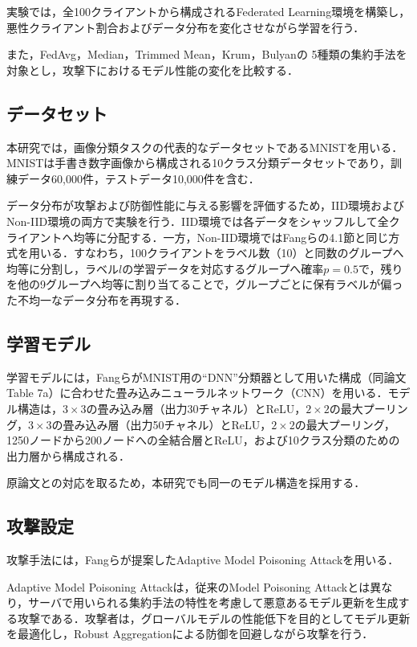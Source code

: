 \documentclass[a4j, twocolumn, dvipdfmx]{jsarticle}  %
\begin{document}
実験では，全100クライアントから構成されるFederated Learning環境を構築し，悪性クライアント割合およびデータ分布を変化させながら学習を行う．

また，FedAvg，Median，Trimmed Mean，Krum，Bulyanの
5種類の集約手法を対象とし，攻撃下におけるモデル性能の変化を比較する．

\subsection{データセット}

本研究では，画像分類タスクの代表的なデータセットであるMNISTを用いる．MNISTは手書き数字画像から構成される10クラス分類データセットであり，訓練データ60,000件，テストデータ10,000件を含む．

データ分布が攻撃および防御性能に与える影響を評価するため，IID環境およびNon-IID環境の両方で実験を行う．IID環境では各データをシャッフルして全クライアントへ均等に分配する．一方，Non-IID環境ではFangら\cite{fang2020local}の4.1節と同じ方式を用いる．すなわち，100クライアントをラベル数（10）と同数のグループへ均等に分割し，ラベル$l$の学習データを対応するグループへ確率$p=0.5$で，残りを他の9グループへ均等に割り当てることで，グループごとに保有ラベルが偏った不均一なデータ分布を再現する．

\subsection{学習モデル}

学習モデルには，Fangら\cite{fang2020local}がMNIST用の``DNN''分類器として用いた構成（同論文Table 7a）に合わせた畳み込みニューラルネットワーク（CNN）を用いる．モデル構造は，$3\times3$の畳み込み層（出力30チャネル）とReLU，$2\times2$の最大プーリング，$3\times3$の畳み込み層（出力50チャネル）とReLU，$2\times2$の最大プーリング，1250ノードから200ノードへの全結合層とReLU，および10クラス分類のための出力層から構成される．

原論文との対応を取るため，本研究でも同一のモデル構造を採用する．

\subsection{攻撃設定}

攻撃手法には，Fangらが提案したAdaptive Model Poisoning Attackを用いる．

Adaptive Model Poisoning Attackは，従来のModel Poisoning Attackとは異なり，サーバで用いられる集約手法の特性を考慮して悪意あるモデル更新を生成する攻撃である．攻撃者は，グローバルモデルの性能低下を目的としてモデル更新を最適化し，Robust Aggregationによる防御を回避しながら攻撃を行う．
\end{document}
